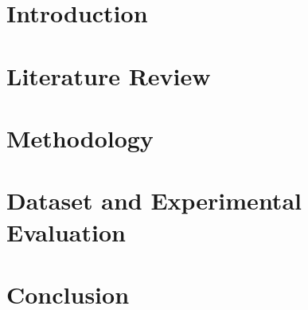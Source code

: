 \documentclass[12pt]{report}
\begin{document}
\renewcommand{\chaptermark}[1]{%
  \markboth{CHAPTER \thechapter\ -- #1}{}}

\fancyhead[R]{\leftmark}

\fancyfoot[C]{\thepage}



\chapter{Introduction}


\chapter{Literature Review}


\chapter{Methodology}


\chapter{Dataset and Experimental Evaluation}


\chapter{Conclusion}



\end{document}

